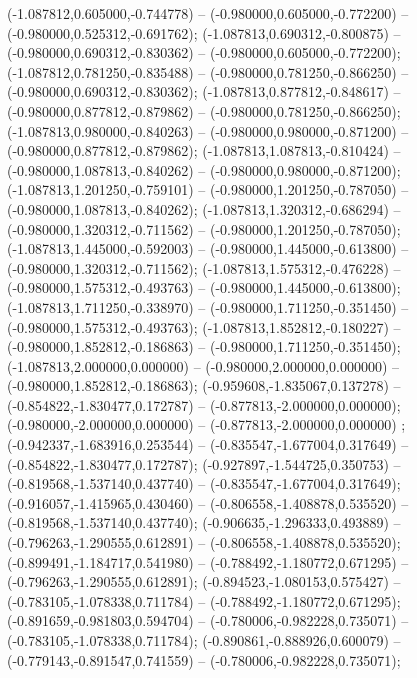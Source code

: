  (-1.087812,0.605000,-0.744778) -- (-0.980000,0.605000,-0.772200) -- (-0.980000,0.525312,-0.691762);
 (-1.087813,0.690312,-0.800875) -- (-0.980000,0.690312,-0.830362) -- (-0.980000,0.605000,-0.772200);
 (-1.087812,0.781250,-0.835488) -- (-0.980000,0.781250,-0.866250) -- (-0.980000,0.690312,-0.830362);
 (-1.087813,0.877812,-0.848617) -- (-0.980000,0.877812,-0.879862) -- (-0.980000,0.781250,-0.866250);
 (-1.087813,0.980000,-0.840263) -- (-0.980000,0.980000,-0.871200) -- (-0.980000,0.877812,-0.879862);
 (-1.087813,1.087813,-0.810424) -- (-0.980000,1.087813,-0.840262) -- (-0.980000,0.980000,-0.871200);
 (-1.087813,1.201250,-0.759101) -- (-0.980000,1.201250,-0.787050) -- (-0.980000,1.087813,-0.840262);
 (-1.087813,1.320312,-0.686294) -- (-0.980000,1.320312,-0.711562) -- (-0.980000,1.201250,-0.787050);
 (-1.087813,1.445000,-0.592003) -- (-0.980000,1.445000,-0.613800) -- (-0.980000,1.320312,-0.711562);
 (-1.087813,1.575312,-0.476228) -- (-0.980000,1.575312,-0.493763) -- (-0.980000,1.445000,-0.613800);
 (-1.087813,1.711250,-0.338970) -- (-0.980000,1.711250,-0.351450) -- (-0.980000,1.575312,-0.493763);
 (-1.087813,1.852812,-0.180227) -- (-0.980000,1.852812,-0.186863) -- (-0.980000,1.711250,-0.351450);
 (-1.087813,2.000000,0.000000) -- (-0.980000,2.000000,0.000000) -- (-0.980000,1.852812,-0.186863);
 (-0.959608,-1.835067,0.137278) -- (-0.854822,-1.830477,0.172787) -- (-0.877813,-2.000000,0.000000);
 (-0.980000,-2.000000,0.000000) -- (-0.877813,-2.000000,0.000000) ;
 (-0.942337,-1.683916,0.253544) -- (-0.835547,-1.677004,0.317649) -- (-0.854822,-1.830477,0.172787);
 (-0.927897,-1.544725,0.350753) -- (-0.819568,-1.537140,0.437740) -- (-0.835547,-1.677004,0.317649);
 (-0.916057,-1.415965,0.430460) -- (-0.806558,-1.408878,0.535520) -- (-0.819568,-1.537140,0.437740);
 (-0.906635,-1.296333,0.493889) -- (-0.796263,-1.290555,0.612891) -- (-0.806558,-1.408878,0.535520);
 (-0.899491,-1.184717,0.541980) -- (-0.788492,-1.180772,0.671295) -- (-0.796263,-1.290555,0.612891);
 (-0.894523,-1.080153,0.575427) -- (-0.783105,-1.078338,0.711784) -- (-0.788492,-1.180772,0.671295);
 (-0.891659,-0.981803,0.594704) -- (-0.780006,-0.982228,0.735071) -- (-0.783105,-1.078338,0.711784);
 (-0.890861,-0.888926,0.600079) -- (-0.779143,-0.891547,0.741559) -- (-0.780006,-0.982228,0.735071);
